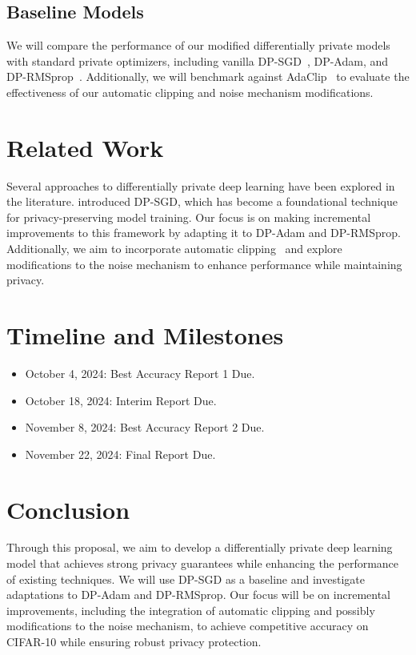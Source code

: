 \documentclass{article}
\begin{document}
    \subsection{Baseline Models}\label{subsec:baseline-models}
    We will compare the performance of our modified differentially private models with standard private optimizers,
    including vanilla DP-SGD~\cite{Abadi_2016_DeepLearningDifferentialPrivacy}, DP-Adam,
    and DP-RMSprop~\cite{zhou_2020_private_adaptive_algorithms}.
    Additionally, we will benchmark against AdaClip~\cite{adaClip_2019} to evaluate the effectiveness of our automatic
    clipping and noise mechanism modifications.


    \section{Related Work}\label{sec:related-work}
    Several approaches to differentially private deep learning have been explored in the literature.
    \cite{Abadi_2016_DeepLearningDifferentialPrivacy} introduced DP-SGD, which has become a foundational technique for
    privacy-preserving model training.
    Our focus is on making incremental improvements to this framework by adapting it to DP-Adam and DP-RMSprop.
    Additionally, we aim to incorporate automatic clipping~\cite{bu2023automaticclippingdifferentiallyprivate}
    and explore modifications to the noise mechanism to enhance performance while maintaining privacy.


    \section{Timeline and Milestones}\label{sec:timeline-and-milestones}
    \begin{itemize}
        \item October 4, 2024: Best Accuracy Report 1 Due.
        \item October 18, 2024: Interim Report Due.
        \item November 8, 2024: Best Accuracy Report 2 Due.
        \item November 22, 2024: Final Report Due.
    \end{itemize}


    \section{Conclusion}\label{sec:conclusion}
    Through this proposal, we aim to develop a differentially private deep learning model that achieves strong
    privacy guarantees while enhancing the performance of existing techniques.
    We will use DP-SGD as a baseline and investigate adaptations to DP-Adam and DP-RMSprop.
    Our focus will be on incremental improvements, including the integration of automatic clipping and possibly
    modifications to the noise mechanism, to achieve competitive accuracy on CIFAR-10 while ensuring
    robust privacy protection.
\end{document}
